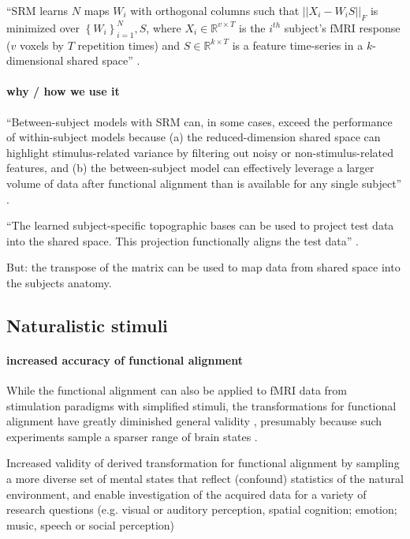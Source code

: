 %
``SRM learns $N$ maps $W_{i}$ with orthogonal columns such that
$||X_{i}-W_{i}S||_{F}$ is minimized over $\left\{ W_{i}\right\} _{i=1}^{N},S$,
where $X_{i}\in\mathbb{R}^{v\times{T}}$ is the $i^{th}$ subject's fMRI response
($v$ voxels by $T$ repetition times) and $S\in\mathbb{R}^{k\times{T}}$ is a
feature time-series in a $k$-dimensional shared space''
\citep{vodrahalli2018mapping}.


\paragraph{why / how we use it}



%
``Between-subject models with SRM can, in some cases, exceed the performance of
within-subject models because (a) the reduced-dimension shared space can
highlight stimulus-related variance by filtering out noisy or
non-stimulus-related features, and (b) the between-subject model can effectively
leverage a larger volume of data after functional alignment than is available
for any single subject'' \citep{kumar2020brainiak}.

%
``The learned subject-specific topographic bases can be used to project test
data into the shared space. This projection functionally aligns the test data''
\citep{kumar2020brainiak}.

But: the transpose of the matrix can be used to map data from shared space into
the subjects anatomy.


\subsection{Naturalistic stimuli}


\paragraph{increased accuracy of functional alignment}
%
While the functional alignment can also be applied to fMRI data from stimulation
paradigms with simplified stimuli, the transformations for functional alignment
have greatly diminished general validity \citep{haxby2011common}, presumably
because such experiments sample a sparser range of brain states
\citep{guntupalli2016model}.

%
Increased validity of derived transformation for functional alignment by
sampling a more diverse set of mental states that reflect (confound) statistics
of the natural environment, and enable investigation of the acquired data for a
variety of research questions (e.g. visual or auditory perception, spatial
cognition; emotion; music, speech or social perception)

